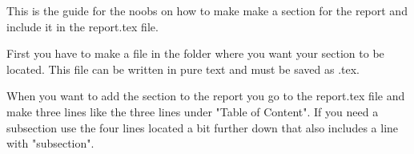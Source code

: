 This is the guide for the noobs on how to make make a section for the report
and include it in the report.tex file.

First you have to make a file in the folder where you want your section to be located.
This file can be written in pure text and must be saved as .tex.

When you want to add the section to the report you go to the report.tex file 
and make three lines like the three lines under "Table of Content".
If you need a subsection use the four lines located a bit further down that also
includes a line with "subsection".
